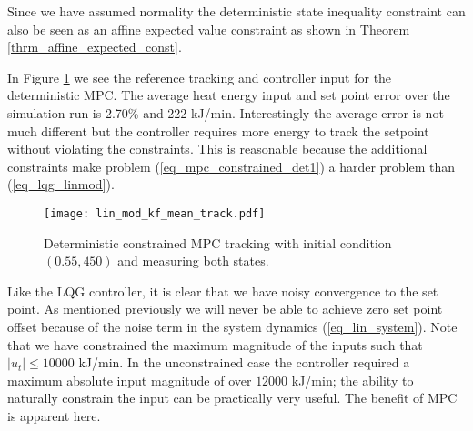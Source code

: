 Since we have assumed normality the deterministic state inequality constraint can also be seen as an affine expected value constraint as shown in Theorem \ref{thrm_affine_expected_const}.

In Figure \ref{fig_lin_mod_kf_mean_track} we see the reference tracking and controller input for the deterministic MPC. The average heat energy input and set point error over the simulation run is 2.70\% and 222 kJ/min. Interestingly the average error is not much different but the controller requires more energy to track the setpoint without violating the constraints. This is reasonable because the additional constraints make problem (\ref{eq_mpc_constrained_det1}) a harder problem than (\ref{eq_lqg_linmod}).
\begin{figure}[H] 
\centering
\texttt{[image: lin\_mod\_kf\_mean\_track.pdf]}
\caption{Deterministic constrained MPC tracking with initial condition $(0.55, 450)$ and measuring both states.}
\label{fig_lin_mod_kf_mean_track}
\end{figure}
Like the LQG controller, it is clear that we have noisy convergence to the set point. As mentioned previously we will never be able to achieve zero set point offset because of the noise term in the system dynamics (\ref{eq_lin_system}). Note that we have constrained the maximum magnitude of the inputs such that $|u_t| \leq 10000$ kJ/min. In the unconstrained case the controller required a maximum absolute input magnitude of over $12000$ kJ/min; the ability to naturally constrain the input can be practically very useful. The benefit of MPC is apparent here.

